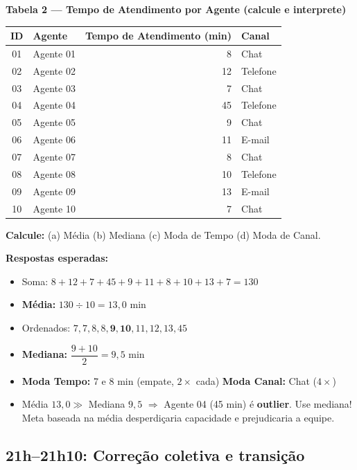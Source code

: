 \begin{BoardBox}
\textbf{Tabela 2 — Tempo de Atendimento por Agente (calcule e interprete)}

\medskip
\begin{tabular}{|c|l|r|l|}
\hline
\textbf{ID} & \textbf{Agente} & \textbf{Tempo de Atendimento (min)} & \textbf{Canal} \\
\hline
01 & Agente 01 &  8 & Chat     \\
02 & Agente 02 & 12 & Telefone \\
03 & Agente 03 &  7 & Chat     \\
04 & Agente 04 & 45 & Telefone \\
05 & Agente 05 &  9 & Chat     \\
06 & Agente 06 & 11 & E-mail   \\
07 & Agente 07 &  8 & Chat     \\
08 & Agente 08 & 10 & Telefone \\
09 & Agente 09 & 13 & E-mail   \\
10 & Agente 10 &  7 & Chat     \\
\hline
\end{tabular}

\smallskip
\textbf{Calcule:} (a) Média \quad (b) Mediana \quad
(c) Moda de Tempo \quad (d) Moda de Canal.

\smallskip
\textbf{Respostas esperadas:}
\begin{itemize}
  \item Soma: $8+12+7+45+9+11+8+10+13+7 = 130$
  \item \textbf{Média:} $130 \div 10 = 13{,}0$ min
  \item Ordenados: $7, 7, 8, 8, \mathbf{9, 10}, 11, 12, 13, 45$
  \item \textbf{Mediana:} $\dfrac{9+10}{2} = 9{,}5$ min
  \item \textbf{Moda Tempo:} 7 e 8 min (empate, $2\times$ cada)
    \quad \textbf{Moda Canal:} Chat ($4\times$)
  \item Média $13{,}0 \gg$ Mediana $9{,}5$ $\Rightarrow$ Agente 04 (45 min) é
  \textbf{outlier}. Use mediana! Meta baseada na média desperdiçaria capacidade
  e prejudicaria a equipe.
\end{itemize}
\end{BoardBox}

\subsection{21h–21h10: Correção coletiva e transição}

